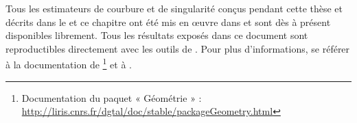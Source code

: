 Tous les estimateurs de courbure et de singularité conçus pendant cette thèse et
décrits dans le  et ce chapitre ont été mis en œuvre
dans \DGtal et sont dès à présent disponibles librement. Tous les résultats
exposés dans ce document sont reproductibles directement avec les outils de
\DGtal. Pour plus d'informations, se référer à la documentation de
\DGtal\footnote{Documentation du paquet « Géométrie » :
\url{http://liris.cnrs.fr/dgtal/doc/stable/packageGeometry.html}} et à
\cite{Coeurjolly2013Implementation}.
